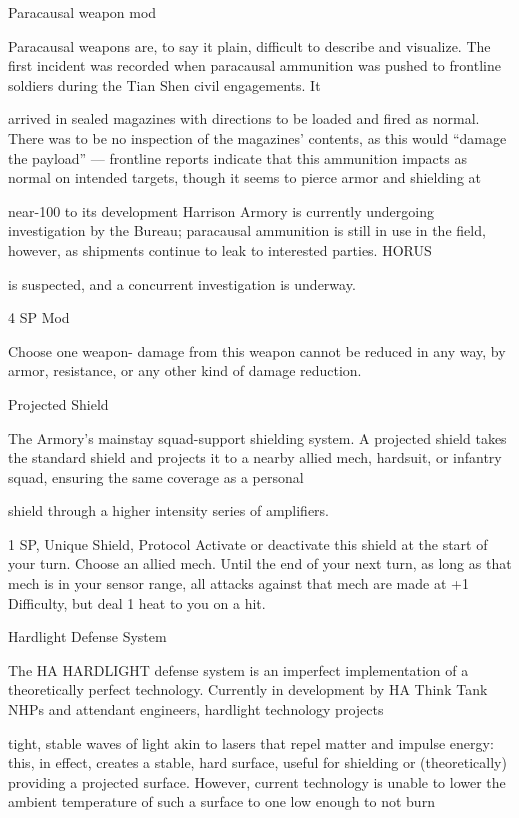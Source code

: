 Paracausal weapon mod

Paracausal weapons are, to say it plain, difficult to describe and visualize. The first incident was recorded
when paracausal ammunition was pushed to frontline soldiers during the Tian Shen civil engagements. It

arrived in sealed magazines with directions to be loaded and fired as normal. There was to be no inspection
of the magazines’ contents, as this would “damage the payload” — frontline reports indicate that this
ammunition impacts as normal on intended targets, though it seems to pierce armor and shielding at




near-100%
to its development Harrison Armory is currently undergoing investigation by the Bureau; paracausal
ammunition is still in use in the field, however, as shipments continue to leak to interested parties. HORUS

is suspected, and a concurrent investigation is underway.

4 SP
Mod

Choose one weapon- damage from this weapon cannot be reduced in any way, by armor,
resistance, or any other kind of damage reduction.


Projected Shield

The Armory’s mainstay squad-support shielding system. A projected shield takes the standard shield and
projects it to a nearby allied mech, hardsuit, or infantry squad, ensuring the same coverage as a personal

shield through a higher intensity series of amplifiers.

1 SP, Unique
Shield, Protocol
Activate or deactivate this shield at the start of your turn. Choose an allied mech. Until the end of
your next turn, as long as that mech is in your sensor range, all attacks against that mech are
made at +1 Difficulty, but deal 1 heat to you on a hit.


Hardlight Defense System

The HA HARDLIGHT defense system is an imperfect implementation of a theoretically perfect technology.
Currently in development by HA Think Tank NHPs and attendant engineers, hardlight technology projects

tight, stable waves of light akin to lasers that repel matter and impulse energy: this, in effect, creates a
stable, hard surface, useful for shielding or (theoretically) providing a projected surface. However, current
technology is unable to lower the ambient temperature of such a surface to one low enough to not burn

